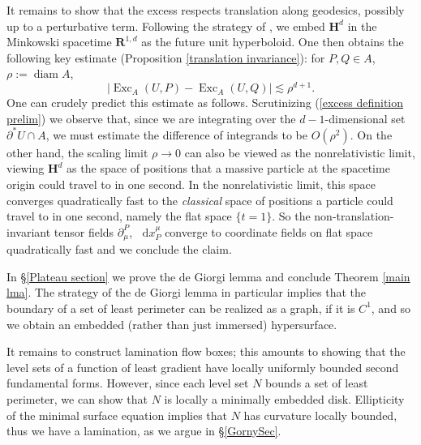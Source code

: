 \documentclass[reqno,10pt]{amsart}
\newcommand{\RR}{\mathbf{R}}
\newcommand{\Hyp}{\mathbf H}
\newcommand{\Sph}{\mathbf S}
\DeclareMathOperator{\diam}{diam}
\DeclareMathOperator{\Exc}{Exc}
\newcommand*\dif{\mathop{}\!\mathrm{d}}
\theoremstyle{definition}
\numberwithin{equation}{section}
\begin{document}
It remains to show that the excess respects translation along geodesics, possibly up to a perturbative term.
Following the strategy of \cite{daskalopoulosPrep1}, we embed $\Hyp^d$ in the Minkowski spacetime $\RR^{1, d}$ as the future unit hyperboloid.
One then obtains the following key estimate (Proposition \ref{translation invariance}): for $P, Q \in A$, $\rho := \diam A$,
$$|\Exc_A(U, P) - \Exc_A(U, Q)| \lesssim \rho^{d + 1}.$$
One can crudely predict this estimate as follows. 
Scrutinizing (\ref{excess definition prelim}) we observe that, since we are integrating over the $d-1$-dimensional set $\partial^* U \cap A$, we must estimate the difference of integrands to be $O(\rho^2)$.
On the other hand, the scaling limit $\rho \to 0$ can also be viewed as the nonrelativistic limit, viewing $\Hyp^d$ as the space of positions that a massive particle at the spacetime origin could travel to in one second.
In the nonrelativistic limit, this space converges quadratically fast to the \emph{classical} space of positions a particle could travel to in one second, namely the flat space $\{t = 1\}$.
So the non-translation-invariant tensor fields $\partial_\mu^P$, $\dif x^\mu_P$ converge to coordinate fields on flat space quadratically fast and we conclude the claim.

In \S\ref{Plateau section} we prove the de Giorgi lemma and conclude Theorem \ref{main lma}.
The strategy of the de Giorgi lemma in particular implies that the boundary of a set of least perimeter can be realized as a graph, if it is $C^1$, and so we obtain an embedded (rather than just immersed) hypersurface.

It remains to construct lamination flow boxes; this amounts to showing that the level sets of a function of least gradient have locally uniformly bounded second fundamental forms.
However, since each level set $N$ bounds a set of least perimeter, we can show that $N$ is locally a minimally embedded disk.
Ellipticity of the minimal surface equation implies that $N$ has curvature locally bounded, thus we have a lamination, as we argue in \S\ref{GornySec}.




\end{document}
